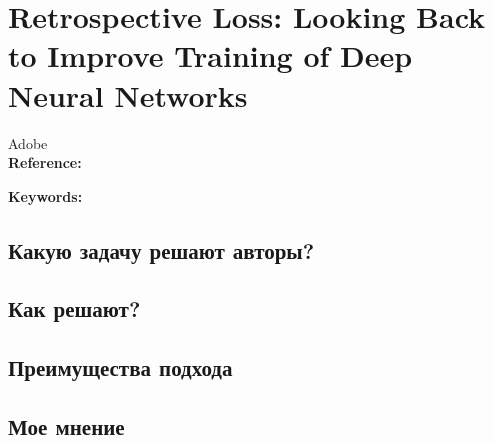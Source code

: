 \chapter{Retrospective Loss: Looking Back to Improve Training of Deep Neural Networks}

Adobe \\

\textbf{Reference:}~\cite{jandial2020retrospective}

\textbf{Keywords:} 

\section{Какую задачу решают авторы?}

\section{Как решают?}

\section{Преимущества подхода}

\section{Мое мнение}